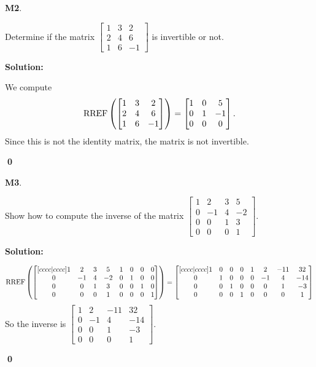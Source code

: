 \documentclass{article}
\newenvironment{problem}[1]
{
  \begin{flushleft}
  \textbf{#1}.
  \ignorespaces
}
{
  \end{flushleft}
}
\newenvironment{solution}
{
  \ignorespaces
  \textbf{Solution:}
}
{
  \ignorespacesafterend
  \begin{flushright}
  {\bfseries \qed}
  \end{flushright}
}
\begin{document}
\begin{problem}{M2}
Determine if the matrix \(\begin{bmatrix}1 & 3 & 2  \\ 2 & 4 & 6  \\ 1 & 6 & -1 \end{bmatrix}\) is invertible or not.
\end{problem}
\begin{solution}
We compute
\[\operatorname{RREF}\left(\begin{bmatrix}1 & 3 & 2  \\ 2 & 4 & 6  \\ 1 & 6 & -1 \end{bmatrix}\right) = \begin{bmatrix} 1 & 0 & 5 \\ 0 & 1 & -1 \\ 0 & 0 & 0 \end{bmatrix}.\]
Since this is not the identity matrix, the matrix is not invertible.
\end{solution}

\begin{problem}{M3}
Show how to compute the inverse of the matrix
\(\begin{bmatrix}
1 & 2 & 3 & 5 \\ 0 & -1 & 4 & -2 \\ 0 & 0 & 1 & 3 \\ 0 & 0 & 0 & 1
\end{bmatrix}\).
\end{problem}
\begin{solution}
\[\operatorname{RREF}\left(\begin{bmatrix}[cccc|cccc] 1 & 2 & 3 & 5 & 1 & 0 & 0 & 0  \\ 0 & -1 & 4 & -2 & 0 & 1 & 0 & 0 \\ 0 & 0 & 1 & 3 & 0 & 0 & 1 & 0 \\ 0 & 0 & 0 & 1 & 0 & 0 & 0 & 1 \end{bmatrix}\right) = \begin{bmatrix}[cccc|cccc] 1 & 0 & 0 &0 & 1 & 2 & -11 & 32 \\ 0 & 1 & 0 & 0 & 0 & -1 & 4 & -14 \\ 0 & 0 & 1 & 0 & 0 & 0 & 1 & -3 \\ 0 & 0 & 0 & 1 & 0 & 0 & 0 & 1 \end{bmatrix}\]
So the inverse is \(\begin{bmatrix}  1 & 2 & -11 & 32 \\ 0 & -1 & 4 & -14 \\  0 & 0 & 1 & -3 \\ 0 & 0 & 0 & 1 \end{bmatrix}\).
\end{solution}
\end{document}
